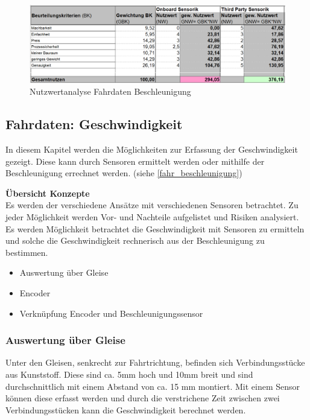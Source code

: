 \documentclass[../../main.tex]{subfiles}
\begin{document}
    \begin{figure}[H]
        \centering
        \includegraphics[width=1.0\textwidth]{Nutzweranalyse_Fahrdaten_Beschleunigung.png}
        \caption {Nutzwertanalyse Fahrdaten Beschleunigung}
        \label{fig:fahr_nutzwertanalyse_beschleunigung}
    \end{figure}

    \subsection{Fahrdaten: Geschwindigkeit}
    In diesem Kapitel werden die Möglichkeiten zur Erfassung der Geschwindigkeit gezeigt. Diese kann durch Sensoren ermittelt werden oder mithilfe der Beschleunigung errechnet werden. (siehe \ref{fahr_beschleunigung})

    \textbf{Übersicht Konzepte}\\
    Es werden der verschiedene Ansätze mit verschiedenen Sensoren betrachtet. Zu jeder Möglichkeit werden Vor- und Nachteile aufgelistet und Risiken analysiert.
    Es werden Möglichkeit betrachtet die Geschwindigkeit mit Sensoren zu ermitteln und solche die Geschwindigkeit rechnerisch aus der Beschleunigung zu bestimmen.
    \begin{itemize}
        \item Auswertung über Gleise
        \item Encoder
        \item Verknüpfung Encoder und Beschleunigungssensor
    \end{itemize}

    \subsubsection{Auswertung über Gleise}
    Unter den Gleisen, senkrecht zur Fahrtrichtung, befinden sich Verbindungsstücke aus Kunststoff. Diese sind ca. 5mm hoch und 10mm breit und sind durchschnittlich mit einem Abstand von ca. 15 mm montiert. Mit einem Sensor können diese erfasst werden und durch die verstrichene Zeit zwischen zwei Verbindungsstücken kann die Geschwindigkeit berechnet werden.
\end{document}
